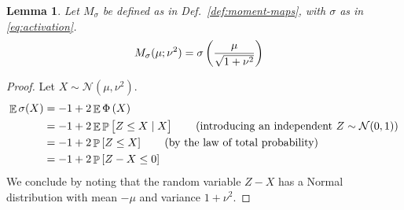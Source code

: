 \documentclass[oneside, article]{memoir}
\newtheorem{lemma}{Lemma}
\DeclareMathOperator{\expect}{\mathbb{E}}
\DeclareMathOperator{\probability}{\mathbb{P}}
\begin{document}
\begin{lemma}
  Let \(M_\sigma\) be defined as in Def.~\ref{def:moment-maps}, with
  \(\sigma\) as in \eqref{eq:activation}.
  \begin{align*}
    M_\sigma(\mu; \nu^2) &= \sigma\del{\frac{\mu}{\sqrt{1 + \nu^2}}}
  \end{align*}
  \label{lem:mean}
\end{lemma}
\begin{proof}
  Let \(X \sim \mathcal N(\mu, \nu^2)\).
  \begin{align}
    \expect \sigma(X)
    &= -1+2\expect \Phi\del{X}
    \\
    &= -1+2\expect \probability \sbr{{Z \leq X} \mid X}
    \tag{introducing an independent \(Z \sim \mathcal{N}(0, 1)\)}
    \\
    &= -1+2\probability\sbr{{Z \leq X}}
    \tag{by the law of total probability}
    \\
    &= -1+2\probability \sbr{Z - X \leq 0}
  \end{align}
  We conclude by noting that the random variable \(Z - X\) has a
  Normal distribution with mean \(-\mu\) and variance \(1 + \nu^2\).
\end{proof}
\end{document}
